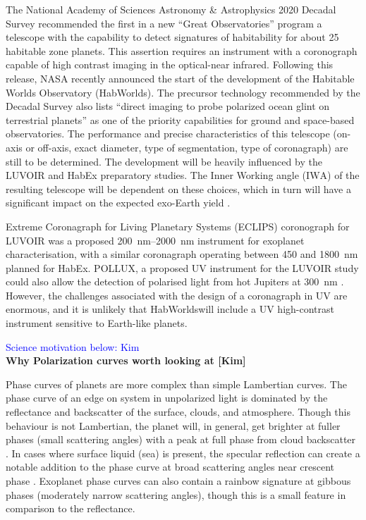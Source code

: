 \documentclass[
    usenatbib,
]{mnras}
\newcommand{\IWA}{\ensuremath{\mathrm{IWA}}}
\newcommand{\hwo}{HabWorlds}
\begin{document}
The National Academy of Sciences Astronomy \& Astrophysics 2020 Decadal Survey \citep{decadal} recommended the first in a new \enquote{Great Observatories} program a telescope with the capability to detect signatures of habitability for about 25 habitable zone planets.
%
This assertion requires an instrument with a coronograph capable of high contrast imaging in the optical-near infrared.
%
Following this release, NASA recently announced the start of the development of the Habitable Worlds Observatory (\hwo).
%
The precursor technology recommended by the Decadal Survey also lists ``direct imaging to probe polarized ocean glint on terrestrial planets'' as one of the priority capabilities \citep[Box E.1 in][]{decadal} for ground and space-based observatories.
%
The performance and precise characteristics of this telescope (on-axis or off-axis, exact diameter, type of segmentation, type of coronagraph) are still to be determined.
%
The development will be heavily influenced by the LUVOIR \citep{LUVOIR2019} and HabEx \citep{HabEx_2020} preparatory studies.
%
The Inner Working angle (\IWA) of the resulting telescope will be dependent on these choices, which in turn will have a significant impact on the expected exo-Earth yield \citep{Stark2019_exoplanetyield}.

Extreme Coronagraph for Living Planetary Systems (ECLIPS) coronograph for LUVOIR was a proposed \SIrange{200}{2000}{\nano\meter} instrument for exoplanet characterisation, with a similar coronagraph operating between \num{450} and \SI{1800}{\nano\meter} planned for HabEx.
%
POLLUX, a proposed UV instrument for the LUVOIR study could also allow the detection of polarised light from hot Jupiters at \SI{300}{\nano\meter} \citep{Bouret2018_pollux}.
%
However, the challenges associated with the design of a coronagraph in UV are enormous, and it is unlikely that \hwo will include a UV high-contrast instrument sensitive to Earth-like planets.



\textcolor{blue}{Science motivation below: Kim}\\
\textbf{Why Polarization curves worth looking at [Kim]}

 Phase curves of planets are more complex than simple Lambertian curves.
 The phase curve of an edge on system in unpolarized light is dominated by the reflectance and backscatter of the surface, clouds, and atmosphere.
 Though this behaviour is not Lambertian, the planet will, in general, get brighter at fuller phases (small scattering angles) with a peak at full phase from cloud backscatter \citep[see, for example,][]{kopparla2018}.
 In cases where surface liquid (sea) is present, the specular reflection can create a notable addition to the phase curve at broad scattering angles near crescent phase \citep{Robinson_2010}.
 Exoplanet phase curves can also contain a rainbow signature at gibbous phases (moderately narrow scattering angles), though this is a small feature in comparison to the reflectance.
\end{document}
